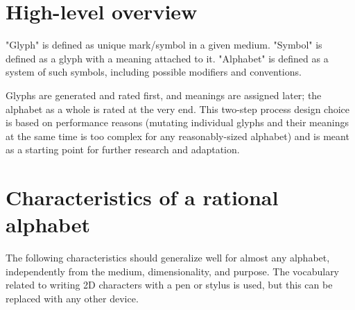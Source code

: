 \documentclass[conference]{IEEEtran}
\begin{document}
\section{High-level overview}
"Glyph" is defined as unique mark/symbol in a given medium. "Symbol" is defined as a glyph with a meaning attached to it. "Alphabet" is defined as a system of such symbols, including possible modifiers and conventions.

Glyphs are generated and rated first, and meanings are assigned later; the alphabet as a whole is rated at the very end. This two-step process design choice is based on performance reasons (mutating individual glyphs and their meanings at the same time is too complex for any reasonably-sized alphabet) and is meant as a starting point for further research and adaptation. 


\section{Characteristics of a rational alphabet}


The following characteristics should generalize well for almost any alphabet, independently from the medium, dimensionality, and purpose. The vocabulary related to writing 2D characters with a pen or stylus is used, but this can be replaced with any other device.  
\end{document}
